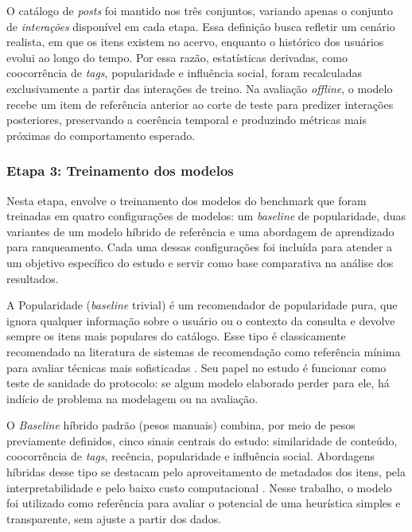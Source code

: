 \documentclass[a4paper,12pt]{article}
\begin{document}
{O catálogo de \textit{posts} foi mantido nos três conjuntos, variando apenas o conjunto de \emph{interações} disponível em cada etapa. Essa definição busca refletir um cenário realista, em que os itens existem no acervo, enquanto o histórico dos usuários evolui ao longo do tempo. Por essa razão, estatísticas derivadas, como coocorrência de \textit{tags}, popularidade e influência social, foram recalculadas exclusivamente a partir das interações de treino. Na avaliação \textit{offline}, o modelo recebe um item de referência anterior ao corte de teste para predizer interações posteriores, preservando a coerência temporal e produzindo métricas mais próximas do comportamento esperado.

\subsubsection{Etapa 3: Treinamento dos modelos}


Nesta etapa, envolve o treinamento dos modelos do benchmark que foram treinadas em quatro configurações de modelos: um \textit{baseline} de popularidade, duas variantes de um modelo híbrido de referência e uma abordagem de aprendizado para ranqueamento. Cada uma dessas configurações foi incluída para atender a um objetivo específico do estudo e servir como base comparativa na análise dos resultados.

A Popularidade (\textit{baseline} trivial) é um recomendador de popularidade pura, que ignora qualquer informação sobre o usuário ou o contexto da consulta e devolve sempre os itens mais populares do catálogo. Esse tipo é classicamente recomendado na literatura de sistemas de recomendação como referência mínima para avaliar técnicas mais sofisticadas \cite{Lops2011CB}. Seu papel no estudo é funcionar como teste de sanidade do protocolo: se algum modelo elaborado perder para ele, há indício de problema na modelagem ou na avaliação.

O \textit{Baseline} híbrido padrão (pesos manuais) combina, por meio de pesos previamente definidos, cinco sinais centrais do estudo: similaridade de conteúdo, coocorrência de \textit{tags}, recência, popularidade e influência social. Abordagens híbridas desse tipo se destacam pelo aproveitamento de metadados dos itens, pela interpretabilidade e pelo baixo custo computacional \cite{Lops2011CB}. Nesse trabalho, o modelo foi utilizado como referência para avaliar o potencial de uma heurística simples e transparente, sem ajuste a partir dos dados.

}
\end{document}
